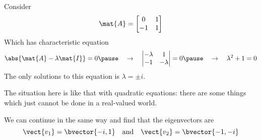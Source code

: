 \documentclass{beamer}
\begin{document}
\begin{frame}
\begin{example}
Consider
\begin{equation*}
\mat{A}=
\begin{bmatrix}
0 & 1 \\
-1 & 1 \\
\end{bmatrix}
\end{equation*}\pause
Which has characteristic equation
\begin{equation*}
\abs{\mat{A}-\lambda\mat{I}}=0\pause
\quad\rightarrow\quad
\begin{vmatrix}
-\lambda & 1 \\
-1 & -\lambda \\
\end{vmatrix}=0\pause
\quad\rightarrow\quad
\lambda^2+1=0
\end{equation*}\pause
The only solutions to this equation is $\lambda=\pm i$.\pause

\vspace{2mm}
The situation here is like that with quadratic equations: there are some things which just cannot be done in a real-valued world.\pause

\vspace{2mm}
We can continue in the same way and find that the eigenvectors are
\begin{equation*}
\vect{v_1}=\bvector{-i,1}
\quad\text{and}\quad
\vect{v_2}=\bvector{-1,-i}
\end{equation*}
\end{example}
\end{frame}
\end{document}
